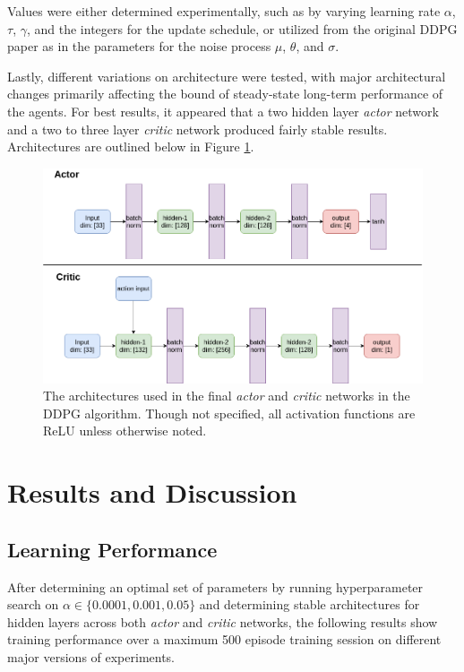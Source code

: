 \documentclass[11pt]{article}
\begin{document}
 Values were either determined experimentally, such as by varying learning rate $\alpha$, $\tau$, $\gamma$, and the integers for the update schedule, or utilized from the original DDPG paper \cite{ddpg} as in the parameters for the noise process $\mu$, $\theta$, and $\sigma$.
 
 Lastly, different variations on architecture were tested, with major architectural changes primarily affecting the bound of steady-state long-term performance of the agents. For best results, it appeared that a two hidden layer \textit{actor} network and a two to three layer \textit{critic} network produced fairly stable results. Architectures are outlined below in Figure \ref{fig:nn-architecture}.
  
 \FloatBarrier
 
 \begin{figure}[!ht]
 	\centering
 	\includegraphics[width=0.8\linewidth]{images/architectures.png}
 	\caption{The architectures used in the final \textit{actor} and \textit{critic} networks in the DDPG algorithm. Though not specified, all activation functions are ReLU unless otherwise noted.}
 	\label{fig:nn-architecture}
 \end{figure}
 
 \FloatBarrier
 

\section{Results and Discussion}

\subsection{Learning Performance}

After determining an optimal set of parameters by running hyperparameter search on $\alpha \in \{0.0001, 0.001, 0.05\}$ and determining stable architectures for hidden layers across both \textit{actor} and \textit{critic} networks, the following results show training performance over a maximum 500 episode training session on different major versions of experiments.
\end{document}
